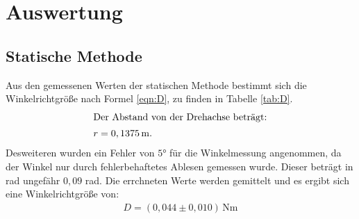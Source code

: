 \newpage
\section{Auswertung}
\label{sec:Auswertung}
\subsection{Statische Methode}
\label{sec:Statische}
Aus den gemessenen Werten der statischen Methode bestimmt sich die Winkelrichtgröße nach Formel \eqref{eqn:D}, zu finden in Tabelle \ref{tab:D}.
\begin{align}
\intertext{Der Abstand von der Drehachse beträgt:}
 r=0,1375\,\si{\meter}.
\end{align}
Desweiteren wurden ein Fehler von $5°$ für die Winkelmessung angenommen, da der Winkel nur durch fehlerbehaftetes Ablesen gemessen wurde.
Dieser beträgt in rad ungefähr $0,09$ rad.
Die errchneten Werte werden gemittelt und es ergibt sich eine Winkelrichtgröße von:
\begin{align}
  D=(0,044\pm0,010)\,\si{\newton\meter}
\end{align}


